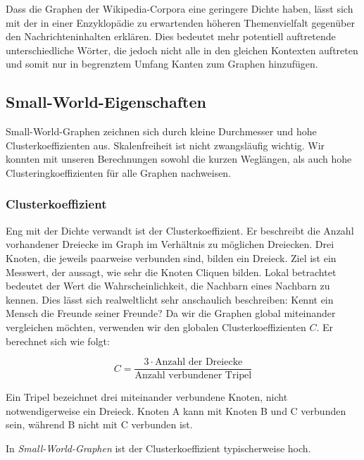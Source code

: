 \documentclass[11pt, a4paper]{article}
\begin{document}
Dass die Graphen der Wikipedia-Corpora eine geringere Dichte haben, lässt sich
mit der in einer Enzyklopädie zu erwartenden höheren Themenvielfalt gegenüber
den Nachrichteninhalten erklären.
Dies bedeutet mehr potentiell auftretende unterschiedliche Wörter, die jedoch
nicht alle in den gleichen Kontexten auftreten und somit nur in begrenztem
Umfang Kanten zum Graphen hinzufügen.


\subsection{Small-World-Eigenschaften}
Small-World-Graphen zeichnen sich durch kleine Durchmesser und
hohe Clusterkoeffizienten aus. Skalenfreiheit ist nicht zwangsläufig wichtig.
Wir konnten mit unseren Berechnungen sowohl die kurzen Weglängen, als auch hohe
Clusteringkoeffizienten für alle Graphen nachweisen.

\subsubsection{Clusterkoeffizient}

Eng mit der Dichte verwandt ist der Clusterkoeffizient. Er beschreibt die
Anzahl vorhandener Dreiecke im Graph im Verhältnis zu möglichen Dreiecken. Drei
Knoten, die jeweils paarweise verbunden sind, bilden ein Dreieck. Ziel ist ein
Messwert, der aussagt, wie sehr die Knoten Cliquen bilden. Lokal betrachtet
bedeutet der Wert die Wahrscheinlichkeit, die Nachbarn eines Nachbarn zu kennen.
Dies lässt sich realweltlicht sehr anschaulich beschreiben: Kennt ein Mensch die 
Freunde seiner Freunde?
Da wir die Graphen global miteinander vergleichen möchten, verwenden wir den
globalen Clusterkoeffizienten $C$. Er berechnet sich wie folgt:

$$
    C = \frac{3\cdot\text{Anzahl der Dreiecke}}{\text{Anzahl verbundener Tripel}}
$$

Ein Tripel bezeichnet drei miteinander verbundene Knoten, nicht
notwendigerweise ein Dreieck. Knoten A kann mit Knoten B und C verbunden sein,
während B nicht mit C verbunden ist.

In \emph{Small-World-Graphen} ist der Clusterkoeffizient typischerweise hoch. 

\end{document}
